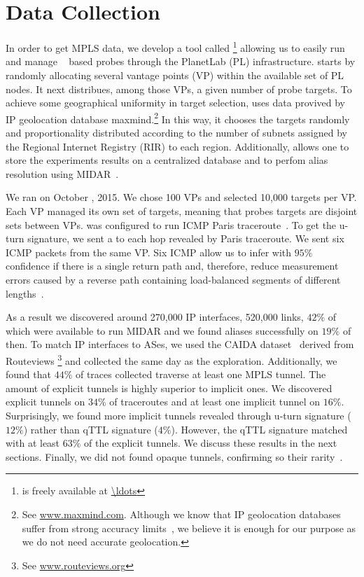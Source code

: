 \section{Data Collection}\label{dataset}
In order to get MPLS data, we develop a tool called
\magallanes\footnote{\magallanes is freely available at \url{\ldots}} allowing
us to easily run and manage \scamper~\cite{Luckie10} based probes through the
PlanetLab (PL) infrastructure.  \magallanes starts by randomly allocating
several vantage points (VP) within the available set of PL nodes.  It next
distribues, among those VPs, a given number of probe targets.
To achieve some geographical uniformity in target selection, \magallanes uses
data provived by IP geolocation database maxmind.\footnote{See
\url{www.maxmind.com}.  Although we know that IP geolocation databases suffer
from strong accuracy limits~\cite{geolocation}, we believe it is enough for our
purpose as we do not need accurate geolocation.}  In this way, it chooses the
targets randomly and proportionality distributed according to the number of
subnets assigned by the Regional Internet Registry (RIR) to each region.
Additionally, \magallanes allows one to store the experiments results on a
centralized database and to perfom alias resolution using MIDAR~\cite{Keys13}.

We ran \magallanes on October , 2015.  We chose 100 VPs and selected
10,000 targets per VP.  Each VP managed its own set of targets, meaning that
probes targets are disjoint sets between VPs.  \scamper was configured to run
ICMP Paris traceroute~\cite{BRICE06}.  To get the u-turn signature,
we sent a \ping to each hop revealed by Paris traceroute. We sent six
ICMP \echorequest packets from the same VP.  Six ICMP \echoreply allow us to
infer with $95\%$ confidence if there is a single return path and, 
therefore, reduce measurement errors caused by a reverse path containing
load-balanced segments of different lengths~\cite{BRICE07}. 

As a result we discovered around 270,000 IP interfaces,  520,000 links, $42\%$
of which were available to run MIDAR and we found aliases successfully on $19\%$
of then. To match IP interfaces to ASes, we used the CAIDA
dataset~\cite{caida_ref} derived from Routeviews \footnote{See
\url{www.routeviews.org}} and collected the same day as the exploration.
Additionally, we found that $44\%$ of traces collected traverse at least one
MPLS tunnel.  The amount of explicit tunnels is highly superior to implicit
ones. We discovered explicit tunnels on $34\%$ of traceroutes and at least one
implicit tunnel on $16\%$. Surprisingly, we found more implicit tunnels revealed
through u-turn signature ($12\%$) rather than qTTL signature
($4\%$). However, the qTTL signature matched with at least $63\%$ of
the explicit tunnels. We discuss these results in the next sections. Finally, we
did not found opaque tunnels, confirming so their rarity~\cite{VAN2013}.
